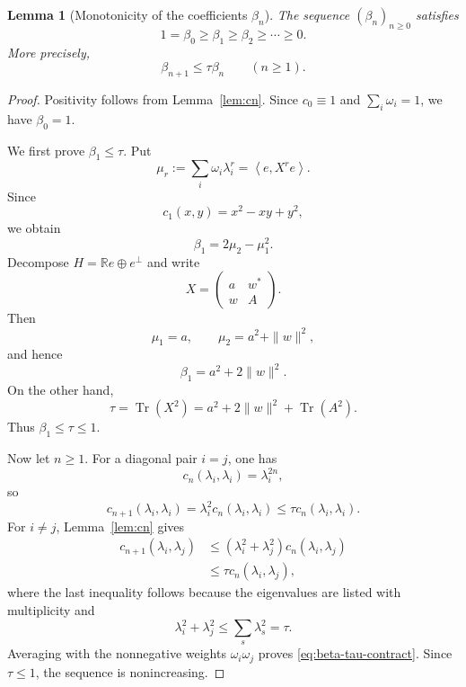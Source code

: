 \documentclass[11pt]{article}
\newtheorem{lemma}[theorem]{Lemma}
\newcommand{\R}{\mathbb{R}}
\newcommand{\ip}[2]{\left\langle #1,#2\right\rangle}
\newcommand{\Tr}{\operatorname{Tr}}
\begin{document}
\begin{lemma}[Monotonicity of the coefficients $\beta_n$]
\label{lem:beta-monotone}
The sequence $(\beta_n)_{n\ge0}$ satisfies
\begin{equation}
  1=\beta_0\ge\beta_1\ge\beta_2\ge\cdots\ge0.
  \label{eq:beta-monotone}
\end{equation}
More precisely,
\begin{equation}
  \beta_{n+1}\le\tau\beta_n
  \qquad(n\ge1).
  \label{eq:beta-tau-contract}
\end{equation}
\end{lemma}

\begin{proof}
Positivity follows from Lemma~\ref{lem:cn}.  Since $c_0\equiv1$ and
$\sum_i\omega_i=1$, we have $\beta_0=1$.

We first prove $\beta_1\le\tau$.  Put
\[
  \mu_r:=\sum_i\omega_i\lambda_i^r=\ip{e}{X^re}.
\]
Since
\[
  c_1(x,y)=x^2-xy+y^2,
\]
we obtain
\begin{equation}
  \beta_1=2\mu_2-\mu_1^2.
  \label{eq:beta1-moments}
\end{equation}
Decompose $H=\R e\oplus e^\perp$ and write
\[
  X=
  \begin{pmatrix}
    a&w^*\\
    w&A
  \end{pmatrix}.
\]
Then
\[
  \mu_1=a,
  \qquad
  \mu_2=a^2+\|w\|^2,
\]
and hence
\begin{equation}
  \beta_1=a^2+2\|w\|^2.
  \label{eq:beta1-block}
\end{equation}
On the other hand,
\begin{equation}
  \tau=\Tr(X^2)=a^2+2\|w\|^2+\Tr(A^2).
  \label{eq:tau-block}
\end{equation}
Thus $\beta_1\le\tau\le1$.

Now let $n\ge1$.  For a diagonal pair $i=j$, one has
\[
  c_n(\lambda_i,\lambda_i)=\lambda_i^{2n},
\]
so
\[
  c_{n+1}(\lambda_i,\lambda_i)
  =\lambda_i^2c_n(\lambda_i,\lambda_i)
  \le\tau c_n(\lambda_i,\lambda_i).
\]
For $i\ne j$, Lemma~\ref{lem:cn} gives
\begin{align*}
  c_{n+1}(\lambda_i,\lambda_j)
  &\le
  (\lambda_i^2+\lambda_j^2)c_n(\lambda_i,\lambda_j)\\
  &\le
  \tau c_n(\lambda_i,\lambda_j),
\end{align*}
where the last inequality follows because the eigenvalues are listed
with multiplicity and
\[
  \lambda_i^2+\lambda_j^2\le\sum_s\lambda_s^2=\tau.
\]
Averaging with the nonnegative weights $\omega_i\omega_j$ proves
\eqref{eq:beta-tau-contract}.  Since $\tau\le1$, the sequence is
nonincreasing.
\end{proof}
\end{document}
